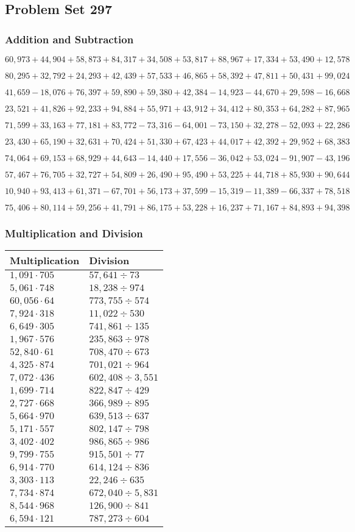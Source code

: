 \hypertarget{problem-set-297}{%
\subsection{Problem Set 297}\label{problem-set-297}}

\hypertarget{addition-and-subtraction}{%
\subsubsection{Addition and
Subtraction}\label{addition-and-subtraction}}

\(60,973+44,904+58,873+84,317+34,508+53,817+88,967+17,334+53,490+12,578\)

\(80,295+32,792+24,293+42,439+57,533+46,865+58,392+47,811+50,431+99,024\)

\(41,659-18,076+76,397+59,890+59,380+42,384-14,923-44,670+29,598-16,668\)

\(23,521+41,826+92,233+94,884+55,971+43,912+34,412+80,353+64,282+87,965\)

\(71,599+33,163+77,181+83,772-73,316-64,001-73,150+32,278-52,093+22,286\)

\(23,430+65,190+32,631+70,424+51,330+67,423+44,017+42,392+29,952+68,383\)

\(74,064+69,153+68,929+44,643-14,440+17,556-36,042+53,024-91,907-43,196\)

\(57,467+76,705+32,727+54,809+26,490+95,490+53,225+44,718+85,930+90,644\)

\(10,940+93,413+61,371-67,701+56,173+37,599-15,319-11,389-66,337+78,518\)

\(75,406+80,114+59,256+41,791+86,175+53,228+16,237+71,167+84,893+94,398\)

\hypertarget{multiplication-and-division}{%
\subsubsection{Multiplication and
Division}\label{multiplication-and-division}}

\begin{longtable}[]{@{}ll@{}}
\toprule
Multiplication & Division\tabularnewline
\midrule
\endhead
\(1,091\cdot705\) & \(57,641÷73\)\tabularnewline
\(5,061\cdot748\) & \(18,238÷974\)\tabularnewline
\(60,056\cdot64\) & \(773,755÷574\)\tabularnewline
\(7,924\cdot318\) & \(11,022÷530\)\tabularnewline
\(6,649\cdot305\) & \(741,861÷135\)\tabularnewline
\(1,967\cdot576\) & \(235,863÷978\)\tabularnewline
\(52,840\cdot61\) & \(708,470÷673\)\tabularnewline
\(4,325\cdot874\) & \(701,021÷964\)\tabularnewline
\(7,072\cdot436\) & \(602,408÷3,551\)\tabularnewline
\(1,699\cdot714\) & \(822,847÷429\)\tabularnewline
\(2,727\cdot668\) & \(366,989÷895\)\tabularnewline
\(5,664\cdot970\) & \(639,513÷637\)\tabularnewline
\(5,171\cdot557\) & \(802,147÷798\)\tabularnewline
\(3,402\cdot402\) & \(986,865÷986\)\tabularnewline
\(9,799\cdot755\) & \(915,501÷77\)\tabularnewline
\(6,914\cdot770\) & \(614,124÷836\)\tabularnewline
\(3,303\cdot113\) & \(22,246÷635\)\tabularnewline
\(7,734\cdot874\) & \(672,040÷5,831\)\tabularnewline
\(8,544\cdot968\) & \(126,900÷841\)\tabularnewline
\(6,594\cdot121\) & \(787,273÷604\)\tabularnewline
\bottomrule
\end{longtable}
